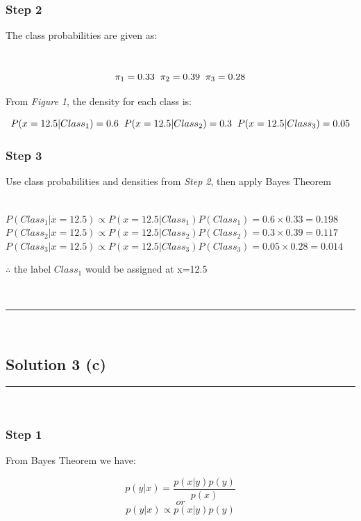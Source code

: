 \documentclass{article}
\begin{document}
\subsubsection*{Step 2}
\parbox{\textwidth}{The class probabilities are given as: }\\
$$\pi_1 = 0.33 \hspace{0.2cm} \pi_2 = 0.39 \hspace{0.2cm} \pi_3 = 0.28$$
\parbox{\textwidth}{From \textit{Figure 1}, the density for each class is:}
$$P(x=12.5|Class_1) = 0.6 \hspace{0.2cm} P(x=12.5|Class_2) = 0.3 \hspace{0.2cm} P(x=12.5|Class_3) = 0.05$$

\subsubsection*{Step 3}

\parbox{\textwidth}{Use class probabilities and densities from \textit{Step 2}, then apply Bayes Theorem}\\

$P(Class_1|x=12.5) \propto P(x=12.5|Class_1)P(Class_1) = 0.6 \times 0.33 = 0.198$\\

$P(Class_2|x=12.5) \propto P(x=12.5|Class_2)P(Class_2) = 0.3 \times 0.39 = 0.117$\\

$P(Class_3|x=12.5) \propto P(x=12.5|Class_3)P(Class_3) = 0.05 \times 0.28 = 0.014$\\

\parbox{\textwidth}{$\therefore$ the label $Class_1$ would be assigned at x=12.5}\\

\noindent\rule{\textwidth}{0.4pt}\\

\newpage
\subsection*{Solution 3 (c)}

\noindent\rule{\textwidth}{0.4pt}\\

\subsubsection*{Step 1}
\parbox{\textwidth}{From Bayes Theorem we have:}
$$p(y|x) = \frac{p(x|y)p(y)}{p(x)}$$
$$or$$
$$p(y|x) \propto p(x|y)p(y)$$
\end{document}
